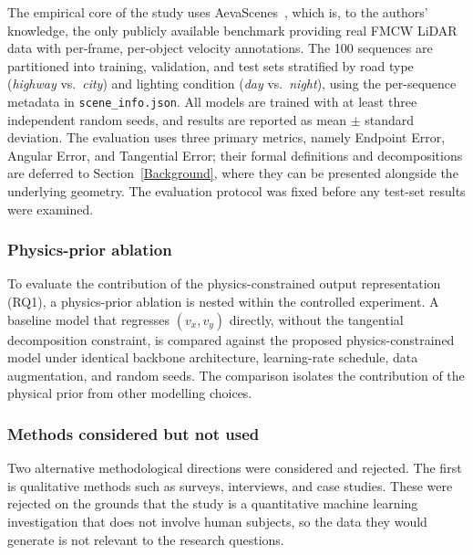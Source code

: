 \documentclass[a4paper,12pt]{article}
\begin{document}
The empirical core of the study uses AevaScenes~\cite{aeva2025aevascenes}, which is, to the authors' knowledge, the only publicly available benchmark providing real FMCW LiDAR data with per-frame, per-object velocity annotations. The 100 sequences are partitioned into training, validation, and test sets stratified by road type (\textit{highway} vs.\ \textit{city}) and lighting condition (\textit{day} vs.\ \textit{night}), using the per-sequence metadata in \texttt{scene\_info.json}. All models are trained with at least three independent random seeds, and results are reported as mean $\pm$ standard deviation. The evaluation uses three primary metrics, namely Endpoint Error, Angular Error, and Tangential Error; their formal definitions and decompositions are deferred to Section~\ref{Background}, where they can be presented alongside the underlying geometry. The evaluation protocol was fixed before any test-set results were examined.

\subsubsection{Physics-prior ablation}

To evaluate the contribution of the physics-constrained output representation (RQ1), a physics-prior ablation is nested within the controlled experiment. A baseline model that regresses $(v_x, v_y)$ directly, without the tangential decomposition constraint, is compared against the proposed physics-constrained model under identical backbone architecture, learning-rate schedule, data augmentation, and random seeds. The comparison isolates the contribution of the physical prior from other modelling choices.

\subsubsection{Methods considered but not used}

Two alternative methodological directions were considered and rejected. The first is qualitative methods such as surveys, interviews, and case studies. These were rejected on the grounds that the study is a quantitative machine learning investigation that does not involve human subjects, so the data they would generate is not relevant to the research questions.
\end{document}
